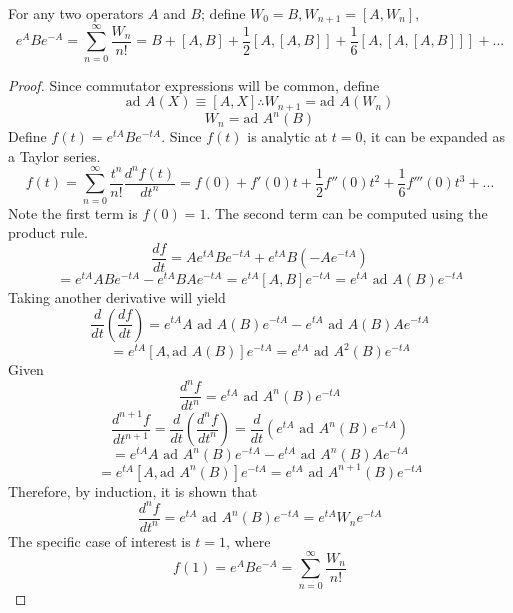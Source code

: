 \begin{sol}
\begin{theorem}
For any two operators $A$ and $B$; define $W_0=B, W_{n+1}=[A,W_n]$,
\begin{equation}
	e^ABe^{-A}=\sum_{n=0}^\infty\frac{W_n}{n!}=B+[A,B]+\frac{1}{2}[A,[A,B]]+\frac{1}{6}[A,[A,[A,B]]]+...
\end{equation} 
\end{theorem}
\begin{proof}
Since commutator expressions will be common, define
\begin{equation}
	\text{ad } A(X)\equiv[A,X]\therefore W_{n+1}=\text{ad }  A(W_n)
\end{equation}
\begin{equation}
	W_n=\text{ad }A^n(B)
\end{equation}
Define $f(t)=e^{tA}Be^{-tA}$. Since $f(t)$ is analytic at $t=0$, it can be expanded as a Taylor series.
\begin{equation}
	f(t)=\sum_{n=0}^\infty \frac{t^n}{n!}\frac{d^nf(t)}{dt^n}=f(0)+f'(0)t+\frac{1}{2}f''(0)t^2+\frac{1}{6}f'''(0)t^3+...
\end{equation} 
Note the first term is $f(0)=1$. The second term can be computed using the product rule.
\begin{equation}
	\frac{df}{dt}=Ae^{tA}Be^{-tA}+e^{tA}B(-Ae^{-tA})
\end{equation} \begin{equation}
	=e^{tA}ABe^{-tA}-e^{tA}BAe^{-tA}=e^{tA}[A,B]e^{-tA}=e^{tA}\text{ ad }A(B)e^{-tA}
\end{equation} 
Taking another derivative will yield
\begin{equation}
	\frac{d}{dt}\left(\frac{df}{dt}\right)=e^{tA}A\text{ ad }A(B)e^{-tA}-e^{tA}\text{ ad }A(B)Ae^{-tA}
\end{equation} 
\begin{equation}
	=e^{tA}[A,\text{ad }A(B)]e^{-tA}=e^{tA}\text{ ad }A^2(B)e^{-tA}
\end{equation}  
Given 
\begin{equation}
	\frac{d^nf}{dt^n}=e^{tA}\text{ ad }A^n(B)e^{-tA}
\end{equation}
\begin{equation}
	\frac{d^{n+1}f}{dt^{n+1}}=\frac{d}{dt}\left(\frac{d^nf}{dt^n}\right)=\frac{d}{dt}\left(e^{tA}\text{ ad }A^n(B)e^{-tA}\right)
\end{equation}
\begin{equation}
	=e^{tA}A\text{ ad }A^{n}(B)e^{-tA}-e^{tA}\text{ ad }A^{n}(B)Ae^{-tA}
\end{equation} 
\begin{equation}
	=e^{tA}[A,\text{ad }A^{n}(B)]e^{-tA}=e^{tA}\text{ ad }A^{n+1}(B)e^{-tA}
\end{equation}
Therefore, by induction, it is shown that 
\begin{equation}
	\frac{d^nf}{dt^n}=e^{tA}\text{ ad }A^n(B)e^{-tA}=e^{tA}W_ne^{-tA}
\end{equation}
The specific case of interest is $t=1$, where 
\begin{equation}
	f(1)=e^{A}Be^{-A}=\sum_{n=0}^\infty\frac{W_n}{n!}
\end{equation}
\end{proof}
\end{sol}